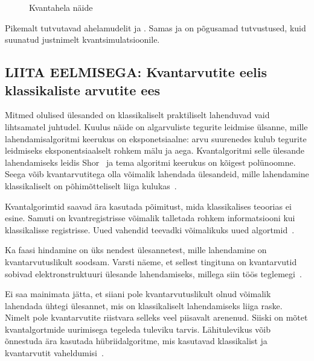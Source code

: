 \documentclass[12pt]{report}
\def\ket#1{\mathinner{|#1\rangle}}
\begin{document}
\begin{figure}
    \centering
    \caption{Kvantahela näide}
    \label{fig:circuits}
\end{figure}

Pikemalt tutvutavad ahelamudelit \cite{nielnsen+chuang} ja
\cite{kaye+laflamme+mosca}. Samas \cite{cao+etal} ja \cite{mcardle+etal} on
põgusamad tutvustused, kuid suunatud justnimelt kvantsimulatsioonile.


\subsection{LIITA EELMISEGA: Kvantarvutite eelis klassikaliste arvutite ees}

Mitmed olulised ülesanded on klassikaliselt praktiliselt lahenduvad vaid lihtsamatel juhtudel.
Kuulus näide on algarvuliste tegurite leidmise ülsanne, mille lahendamisalgoritmi keerukus on eksponetsiaalne: arvu suurenedes kulub tegurite leidmiseks eksponentsiaalselt rohkem mälu ja aega.
Kvantalgoritmi selle ülesande lahendamiseks leidis Shor~\cite{shot} ja tema algoritmi keerukus on kõigest polünoomne.
Seega võib kvantarvutitega olla võimalik lahendada ülesandeid, mille lahendamine klassikaliselt on põhimõtteliselt liiga kulukas~\cite{nielse+chuang, kaye+laflamme+mosca, cao+etal}.

Kvantalgorimtid saavad ära kasutada põimitust, mida klassikalises teoorias ei esine.
Samuti on kvantregistrisse võimalik talletada rohkem informatsiooni kui klassikalisse registrisse.
Uued vahendid teevadki võimalikuks uued algortmid~\cite{cao+etal}.

Ka faasi hindamine on üks nendest ülesannetest, mille lahendamine on kvantarvutuslikult soodsam.
Varsti näeme, et sellest tingituna on kvantarvutid sobivad elektronstruktuuri ülesande lahendamiseks, millega siin töös teglemegi~\cite{cao+etal, mcardle+etal}.

Ei saa mainimata jätta, et siiani pole kvantarvutuslikult olnud võimalik lahendada ühtegi ülesannet, mis on klassikaliselt lahendamiseks liiga raske.
Nimelt pole kvantarvutite riistvara selleks veel piisavalt arenenud.
Siiski on mõtet kvantalgortmide uurimisega tegeleda tuleviku tarvis.
Lähitulevikus võib õnnestuda ära kasutada hübriidalgoritme, mis kasutavad klassikalist ja kvantarvutit vaheldumisi~\cite{omalley+etal}.
\end{document}
